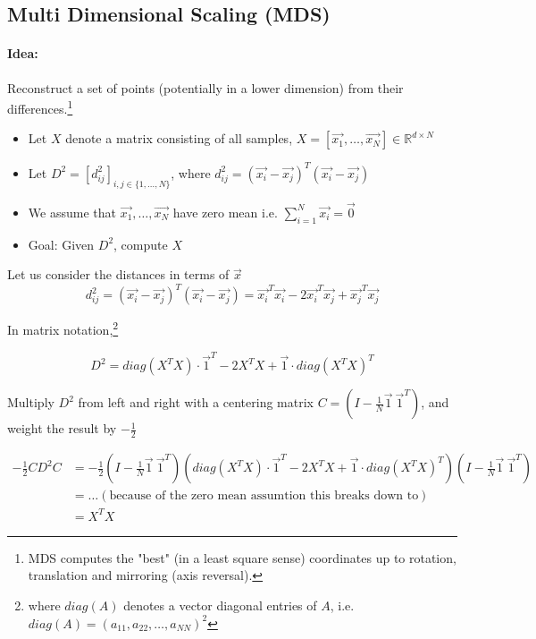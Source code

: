 
\subsection*{Multi Dimensional Scaling (MDS)}

\paragraph{Idea:} Reconstruct a set of points (potentially in a lower dimension) from their differences.\footnote{MDS computes the "best" (in a least square sense) coordinates up to rotation, translation and mirroring (axis reversal).}

\begin{itemize}
    \item  Let \(X\) denote a matrix consisting of all samples, \(X=[\vec{x_1}, \dots, \vec{x_N}] \in \mathbb{R}^{d \times N}\)
    \item  Let \(D^2 = [d_{ij}^2]_{i, j \in \{1, \dots, N\}}\), where \(d_{ij}^2 = (\vec{x_i} - \vec{x_j})^T (\vec{x_i} - \vec{x_j})\)
    \item  We assume that \(\vec{x_1}, \dots, \vec{x_N}\) have zero mean i.e. \(\sum_{i=1}^N \vec{x_i} = \vec{0}\)
    \item  Goal: Given \(D^2\), compute \(X\)
\end{itemize}

Let us consider the distances in terms of \(\vec{x}\)
\[d_{ij}^2 = (\vec{x_i} - \vec{x_j})^T(\vec{x_i} - \vec{x_j})=\vec{x_i}^T \vec{x_i} - 2 \vec{x_i}^T \vec{x_j} + \vec{x_j}^T \vec{x_j} \]

In matrix notation,\footnote{where \(diag(A)\) denotes a vector diagonal entries of \(A\), i.e. \(diag(A) = (a_{11}, a_{22}, \dots, a_{NN})^2\)}

\[D^2 = diag(X^T X) \cdot \vec{1}^T - 2X^TX + \vec{1} \cdot diag(X^T X)^T\]


Multiply \(D^2\) from left and right with a centering matrix \(C = (I - \frac{1}{N} \vec{1} \ \vec{1}^T)\), and weight the result by \(-\frac{1}{2}\)

\begin{align*}
    -\frac{1}{2} C D^2 C &= -\frac{1}{2} (I- \frac{1}{N} \vec{1} \ \vec{1}^T) (diag(X^T X) \cdot \vec{1}^T - 2X^TX + \vec{1} \cdot diag(X^T X)^T)(I- \frac{1}{N} \vec{1} \ \vec{1}^T)\\
    &= \dots (\text{because of the zero mean assumtion this breaks down to}) \\
    &= X^T X
\end{align*}

